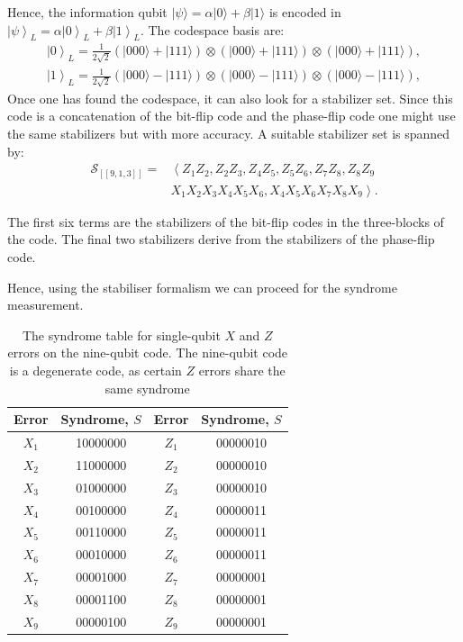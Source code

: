 Hence, the information qubit $|\psi\rangle=\alpha|0\rangle+\beta|1\rangle$ is encoded in $\left|\psi\right\rangle_{L}=\alpha\left|0\right\rangle_{L}+\beta\left|1\right\rangle_{L}$. 
The codespace basis are: 
\begin{equation*}
\begin{split}
\left|0\right\rangle_{L}=\frac{1}{2 \sqrt{2}}(|000\rangle +|111\rangle) \otimes(|000\rangle +|111\rangle) \otimes(|000\rangle +|111\rangle), \\
\left|1\right\rangle_{L}=\frac{1}{2 \sqrt{2}}(|000\rangle -|111\rangle) \otimes(|000\rangle -|111\rangle) \otimes(|000\rangle -|111\rangle), 
\end{split}
\end{equation*}
Once one has found the codespace, it can also look for a stabilizer set. Since this code is a concatenation of the bit-flip code and the phase-flip code one might use the same stabilizers but with more accuracy. 
A suitable stabilizer set is spanned by: 
\begin{equation}
\begin{aligned}
\mathcal{S}_{[[9,1,3]]}=&\left\langle Z_{1} Z_{2}, Z_{2} Z_{3}, Z_{4} Z_{5}, Z_{5} Z_{6}, Z_{7} Z_{8}, Z_{8} Z_{9}\right.\\
&\left.X_{1} X_{2} X_{3} X_{4} X_{5} X_{6}, X_{4} X_{5} X_{6} X_{7} X_{8} X_{9}\right\rangle.
\end{aligned}
\end{equation}

The first six terms are the stabilizers of the bit-flip codes in the three-blocks of the code. The final two stabilizers derive from the stabilizers of the phase-flip code.

Hence, using the stabiliser formalism we can proceed for the syndrome measurement. 
\begin{table}[h]
    \centering
    \begin{tabular}{cc|cc}
\hline Error & Syndrome, $S$ & Error & Syndrome, $S$ \\
\hline$X_{1}$ & 10000000 & $Z_{1}$ & 00000010 \\
$X_{2}$ & 11000000 & $Z_{2}$ & 00000010 \\
$X_{3}$ & 01000000 & $Z_{3}$ & 00000010 \\
$X_{4}$ & 00100000 & $Z_{4}$ & 00000011 \\
$X_{5}$ & 00110000 & $Z_{5}$ & 00000011 \\
$X_{6}$ & 00010000 & $Z_{6}$ & 00000011 \\
$X_{7}$ & 00001000 & $Z_{7}$ & 00000001 \\
$X_{8}$ & 00001100 & $Z_{8}$ & 00000001 \\
$X_{9}$ & 00000100 & $Z_{9}$ & 00000001 \\
\hline
\end{tabular}
\caption{The syndrome table for single-qubit $X$ and $Z$ errors on the nine-qubit code. The nine-qubit code is a degenerate code, as certain $Z$ errors share the same syndrome}
    \label{tab:stab9}
\end{table}


